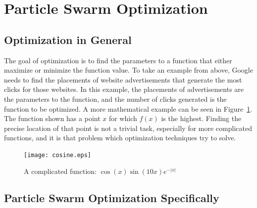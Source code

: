 \documentclass[onecolumn, 12pt]{article}
\begin{document}
\section{Particle Swarm Optimization}
\label{sec:pso}

\subsection{Optimization in General}

The goal of optimization is to find the parameters to a function that either
maximize or minimize the function value.  To take an example from above, Google
needs to find the placements of website advertisements that generate the most
clicks for those websites.  In this example, the placements of advertisements
are the parameters to the function, and the number of clicks generated is the
function to be optimized.  A more mathematical example can be seen in
Figure~\ref{fig:cosine}.  The function shown has a point $x$ for which $f(x)$
is the highest.  Finding the precise location of that point is not a trivial
task, especially for more complicated functions, and it is that problem which
optimization techniques try to solve.

\begin{figure}
  \centering
  \texttt{[image: cosine.eps]}
  \caption{A complicated function: $\cos(x)\sin(10x)e^{-|x|}$}
  \label{fig:cosine}
\end{figure}

\subsection{Particle Swarm Optimization Specifically}
\end{document}
